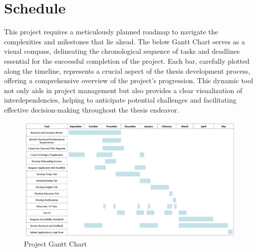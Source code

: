 \chapter{Schedule}

This project requires a meticulously planned roadmap to navigate the complexities and milestones that lie ahead. The below Gantt Chart serves as a visual compass, delineating the chronological sequence of tasks and deadlines essential for the successful completion of the project. Each bar, carefully plotted along the timeline, represents a crucial aspect of the thesis development process, offering a comprehensive overview of the project's progression. This dynamic tool not only aids in project management but also provides a clear visualization of interdependencies, helping to anticipate potential challenges and facilitating effective decision-making throughout the thesis endeavor.

\begin{figure} [H]
    \centering
    \includegraphics[width=1\linewidth]{thesis//chapters//images/ganttChart.png}
    \caption{Project Gantt Chart}
    \label{fig:project-gantt-chart}
\end{figure}

